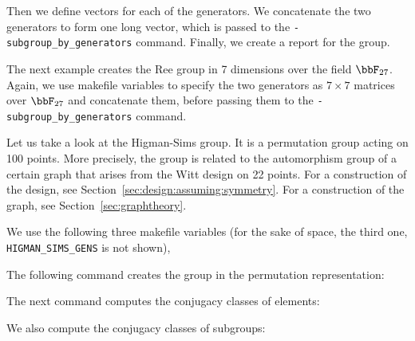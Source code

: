 


Then we define vectors for each of the generators. 
We concatenate the two generators to 
form one long vector, 
which is passed to the \verb'-subgroup_by_generators' command.
Finally, we create a report for the group.






\bigskip

The next example creates the Ree group 
in 7 dimensions over the field $\bbF_{27}$. 
Again, we use makefile variables to specify the 
two generators as $7 \times 7$ matrices over $\bbF_{27}$ 
and concatenate them, 
before passing them to the \verb'-subgroup_by_generators' command.







\bigskip


Let us take a look at the Higman-Sims group. 
It is a permutation group acting on 100 points. 
More precisely, the group is related 
to the automorphism group of a certain graph that arises from 
the Witt design on 22 points. 
For a construction of the design, see Section~\ref{sec:design:assuming:symmetry}.
For a construction of the graph, see Section~\ref{sec:graphtheory}.

\bigskip


We use the following three makefile variables 
(for the sake of space, the third one, \verb'HIGMAN_SIMS_GENS' is not shown), 





The following command creates the group in the permutation representation:




\bigskip


The next command computes the conjugacy classes of elements:


\bigskip

We also compute the conjugacy classes of subgroups:

